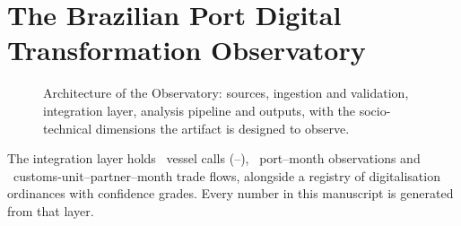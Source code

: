\section{The Brazilian Port Digital Transformation Observatory}
\label{sec:observatory}


\begin{figure}[htbp]
\centering
\resizebox{\textwidth}{!}{}
\caption{Architecture of the Observatory: sources, ingestion and validation,
integration layer, analysis pipeline and outputs, with the socio-technical
dimensions the artifact is designed to observe.}
\label{fig:arquitetura}
\end{figure}

The integration layer holds \Natracacoes\ vessel calls (\Anoinicio--\Anofim),
\Npainellinhas\ port--month observations and \Nfluxoscomercio\
customs-unit--partner--month trade flows, alongside a registry of
digitalisation ordinances with confidence grades. Every number in this
manuscript is generated from that layer.

\PROSA

\FloatBarrier
